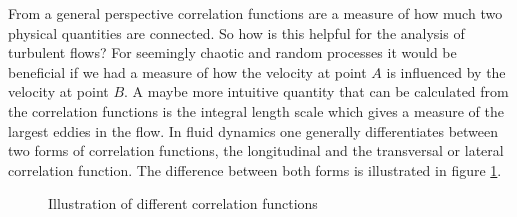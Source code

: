 \documentclass[preprint,12pt,ntfdMod]{elsarticle}
\begin{document}
\begin{par}

\label{sec:correlation}
From a general perspective correlation functions are a measure of how
much two physical quantities are connected. So how is this helpful for
the analysis of turbulent flows? For seemingly chaotic and random
processes it would be beneficial if we had a measure of how the velocity
at point $A$ is influenced by the velocity at point $B$. A maybe more
intuitive quantity that can be calculated from the correlation functions
is the integral length scale which gives a measure of the largest
eddies in the flow. In fluid dynamics one generally differentiates
between two forms of correlation functions, the longitudinal and the
transversal or lateral correlation function. The difference between both forms is
illustrated in figure \ref{fig:correlations}.
\begin{figure}[t!]
        \centering
        \hfill
\caption{Illustration of different correlation functions}
\label{fig:correlations}
\end{figure}
\begin{figure}[hbt]
      \centering

\end{figure}
\end{par}
\end{document}
